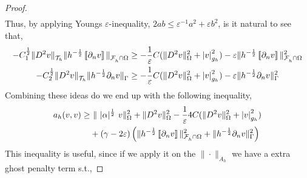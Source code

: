 \begin{proof}
\[\begin{split}
        \end{split}
    \]
    Thus, by applying Youngs $\varepsilon $-inequality, $2ab \le  \varepsilon^{-1} a^{2} + \varepsilon b^{2} $, is it natural to see that,
    \[
        \begin{split}
- C_{1}^{\frac{1}{2}} \| D^2 v    \|_{ \mathcal{T} _{h}   }^{  }  \|h^{-\frac{1}{2}} \left[\!\left[  \partial _{n} v  \right]\!\right]   \|_{ \mathcal{F}^{}_{h}\cap \Omega   }^{  }
& \ge - \frac{1}{\varepsilon } C  (\| D^2 v \|_{ \Omega  }^{ 2 }  + \left\lvert  v  \right\rvert _{ g_{h} }^{2  } ) -  \varepsilon \|h^{-\frac{1}{2}} \left[\!\left[  \partial _{n} v  \right]\!\right]   \|_{ \mathcal{F}^{}_{h}\cap \Omega   }^{2  } \\
- C_{2}^{\frac{1}{2}}  \| D^2 v \|_{ \mathcal{T} _{h} }^{  } \| h^{-\frac{1}{2}}  \partial _{n} v    \|_{ \Gamma    }^{  }
& \ge - \frac{1}{\varepsilon } C  (\| D^2 v \|_{ \Omega  }^{ 2 }  + \left\lvert  v  \right\rvert _{ g_{h} }^{2  } ) -  \varepsilon \|h^{-\frac{1}{2}}  \partial _{n} v    \|_{ \Gamma    }^{2  } \\
        \end{split}
    \]
    Combining these ideas do we end up with the following inequality,
    \[
    \begin{split}
       a_{h}( v,v)  \ge& \     \|\ |\alpha|^{\frac{1}{2}} \  v  \|_{   \Omega   }^{2} +\| D^2v  \|_{   \Omega   }^{2} -  \frac{1}{\varepsilon } 4C  (\| D^2 v \|_{ \Omega  }^{ 2 }  + \left\lvert  v  \right\rvert _{ g_{h} }^{2  } )  \\
                       & + (\gamma - 2\varepsilon  )\left( \|h^{-\frac{1}{2}}  \left[\!\left[  \partial _{n} v  \right]\!\right]\|_{\mathcal{F} _{h}^{} \cap \Omega   }^{ 2 } + \| h^{-\frac{1}{2}} \partial _{n} v \|_{ \Gamma  }^{ 2} \right)        \\
    \end{split}
    \]
    This inequality is useful, since if we apply it on the $\| \cdot  \|_{ A_{h} }^{  } $ we have a extra ghost penalty term s.t.,


\end{proof}
